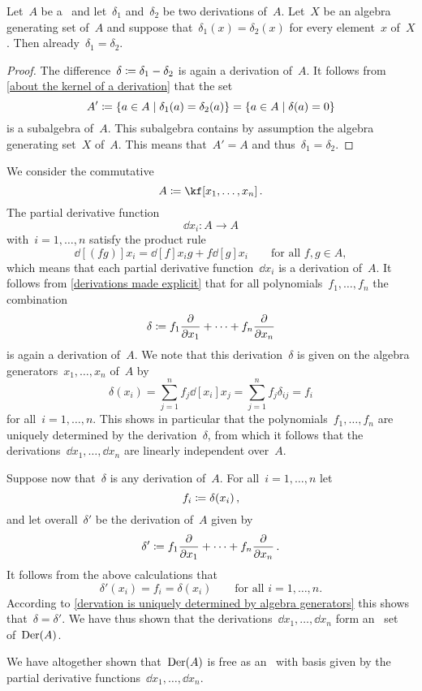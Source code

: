 \begin{proposition}
	\label{dervation is uniquely determined by algebra generators}
	Let~$A$ be a~\algebra{$\kf$} and let~$\delta_1$ and~$\delta_2$ be two derivations of~$A$.
	Let~$X$ be an algebra generating set of~$A$ and suppose that~$\delta_1(x) = \delta_2(x)$ for every element~$x$ of~$X$.
	Then already~$\delta_1 = \delta_2$.
\end{proposition}


\begin{proof}
	The difference~$\delta \coloneqq \delta_1 - \delta_2$ is again a derivation of~$A$.
	It follows from \cref{about the kernel of a derivation} that the set
	\[
		A'
		\defined
		\{
			a \in A
		\suchthat
			\delta_1(a) = \delta_2(a)
		\}
		=
		\{
			a \in A
		\suchthat
			\delta(a) = 0
		\}
	\]
	is a subalgebra of~$A$.
	This subalgebra contains by assumption the algebra generating set~$X$ of~$A$.
	This means that~$A' = A$ and thus~$\delta_1 = \delta_2$.
\end{proof}


\begin{example}
	\label{derivations of commutative polynomial algebra}
	We consider the commutative~\algebra{$\kf$}
	\[
		A \defined \kf[x_1, \dotsc, x_n] \,.
	\]
	The partial derivative function
	\[
		\dd{x_i}
		\colon
		A
		\to
		A
	\]
	with~$i = 1, \dotsc, n$ satisfy the product rule
	\[
		\dd[(fg)]{x_i}
		=
		\dd[f]{x_i} g + f \dd[g]{x_i}
		\qquad
		\text{for all~$f, g \in A$},
	\]
	which means that each partial derivative function~$\dd{x_i}$ is a derivation of~$A$.
	It follows from \cref{derivations made explicit} that for all polynomials~$f_1, \dotsc, f_n$ the~ combination
	\[
		\delta
		\defined
		f_1 \dd{x_1} + \dotsb + f_n \dd{x_n}
	\]
	is again a derivation of~$A$.
	We note that this derivation~$\delta$ is given on the algebra generators~$x_1, \dotsc, x_n$ of~$A$ by
	\[
		\delta(x_i)
		=
		\sum_{j=1}^n f_j \dd[x_i]{x_j}
		=
		\sum_{j=1}^n f_j \delta_{ij}
		=
		f_i
	\]
	for all~$i = 1, \dotsc, n$.
	This shows in particular that the polynomials~$f_1, \dotsc, f_n$ are uniquely determined by the derivation~$\delta$, from which it follows that the derivations~$\dd{x_1}, \dotsc, \dd{x_n}$ are linearly independent over~$A$.

	Suppose now that~$\delta$ is any derivation of~$A$.
	For all~$i = 1, \dotsc, n$ let
	\[
		f_i \coloneqq \delta(x_i) \,,
	\]
	and let overall~$\delta'$ be the derivation of~$A$ given by
	\[
		\delta'
		\defined
		f_1 \dd{x_1} + \dotsb + f_n \dd{x_n} \,.
	\]
	It follows from the above calculations that
	\[
		\delta'(x_i) = f_i = \delta(x_i)
		\qquad
		\text{for all~$i = 1, \dotsc, n$.}
	\]
	According to \cref{dervation is uniquely determined by algebra generators} this shows that~$\delta = \delta'$.
	We have thus shown that the derivations~$\dd{x_1}, \dotsc, \dd{x_n}$ form an~ set of~$\operatorname{Der}(A)$.

	We have altogether shown that~$\operatorname{Der}(A)$ is free as an~ with basis given by the partial derivative functions~$\dd{x_1}, \dotsc, \dd{x_n}$.
\end{example}


